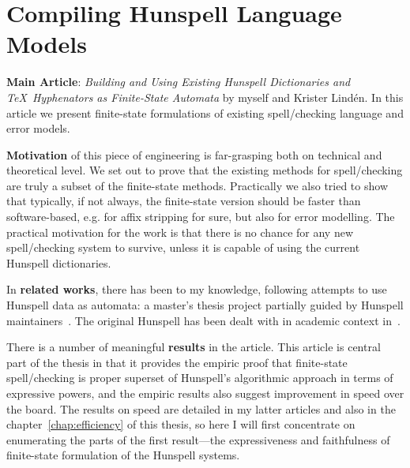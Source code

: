 \documentclass[officiallayout]{unihelcompling}
\begin{document}
\section{Compiling Hunspell Language Models}
\label{sec:Hunspell}

\textbf{Main Article}: \emph{Building and Using Existing Hunspell Dictionaries
and \TeX\ Hyphenators as Finite-State Automata} by myself and Krister Lindén.
In this article we present finite-state formulations of existing spell\-/checking
language and error models.

\textbf{Motivation} of this piece of engineering is far-grasping both on 
technical and theoretical level. We set out to prove that the existing
methods for spell\-/checking are truly a subset of the finite-state methods.
Practically we also tried to show that typically, if not always, the 
finite-state version should be faster than software-based, e.g. for affix
stripping for sure, but also for error modelling. The practical motivation
for the work is that there is no chance for any new spell\-/checking system to
survive, unless it is capable of using the current Hunspell dictionaries.

In \textbf{related works}, there has been to my knowledge, following
attempts to use Hunspell data as automata: a master's thesis project partially
guided by Hunspell maintainers~\citep{greenfield2010open}.
The
original Hunspell has been dealt with in academic context 
in~\citet{tron2005hunmorph}.

There is a number of meaningful \textbf{results} in the article. This article
is central part of the thesis in that it provides the empiric proof that
finite-state spell\-/checking is proper superset of Hunspell's algorithmic 
approach in terms of expressive powers, and the empiric results also suggest
improvement in speed over the board. The results on speed are detailed in my
latter articles and also in the chapter~\ref{chap:efficiency} of this thesis,
so here I will first concentrate on enumerating the parts of the first
result---the expressiveness and faithfulness of finite-state formulation of
the Hunspell systems.
\end{document}
